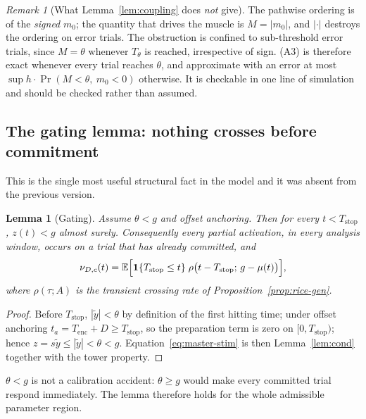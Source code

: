 \documentclass[11pt,a4paper]{article}
\newcommand{\E}{\mathbb{E}}
\newcommand{\Tstop}{T_{\text{stop}}}
\newcommand{\Mrv}{M}
\theoremstyle{plain}
\newtheorem{lemma}{Lemma}
\theoremstyle{remark}
\newtheorem{remark}{Remark}
\begin{document}
\begin{remark}[What Lemma~\ref{lem:coupling} does \emph{not} give]
The pathwise ordering is of the \emph{signed} $m_0$; the quantity that drives the muscle
is $\Mrv=|m_0|$, and $|\cdot|$ destroys the ordering on error trials. The obstruction is
confined to sub-threshold error trials, since $\Mrv=\theta$ whenever $T_\theta$ is reached,
irrespective of sign. (A3) is therefore exact whenever every trial reaches $\theta$, and
approximate with an error at most $\sup h\cdot\Pr(\Mrv<\theta,\ m_0<0)$ otherwise. It is
checkable in one line of simulation and should be checked rather than assumed.
\end{remark}

\subsection{The gating lemma: nothing crosses before commitment}
\label{sec:gate}

This is the single most useful structural fact in the model and it was absent from the
previous version.

\begin{lemma}[Gating]
\label{lem:gate}
Assume $\theta<g$ and offset anchoring. Then for every $t<\Tstop$, $z(t)<g$ almost surely.
Consequently every partial activation, in every analysis window, occurs on a trial that
has already committed, and
\begin{equation}
\nu_{D,c}(t)=\E\Bigl[\mathbf 1\{\Tstop\le t\}\;
\rho\bigl(t-\Tstop;\,g-\mu(t)\bigr)\Bigr],
\label{eq:master-stim}
\end{equation}
where $\rho(\tau;A)$ is the transient crossing rate of Proposition~\ref{prop:rice-gen}.
\end{lemma}

\begin{proof}
Before $\Tstop$, $|\tilde y|<\theta$ by definition of the first hitting time; under offset
anchoring $t_a=T_{\text{enc}}+D\ge\Tstop$, so the preparation term is zero on
$[0,\Tstop)$; hence $z=s\tilde y\le|\tilde y|<\theta<g$. Equation~\eqref{eq:master-stim}
is then Lemma~\ref{lem:cond} together with the tower property.
\end{proof}

$\theta<g$ is not a calibration accident: $\theta\ge g$ would make every committed trial
respond immediately. The lemma therefore holds for the whole admissible parameter region.
\end{document}
